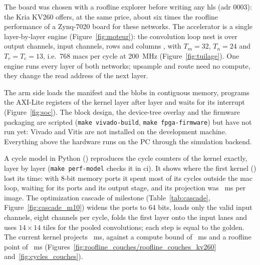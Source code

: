 \documentclass[11pt,a4paper]{article}
\begin{document}
The board was chosen with a \gls{roofline} explorer before writing any \gls{hls} (\gls{adr} 0003): the Kria
KV260 offers, at the same price, about six times the \gls{roofline} performance of a Zynq-7020
board for these networks. The accelerator is a single layer-by-layer engine
(Figure~\ref{fig:moteur}): the convolution loop nest is  over output channels, input
channels, rows and columns \cite[\#010.2]{2015-zhang}, with $T_m=32$, $T_n=24$ and
$T_r=T_c=13$, i.e.\ 768 \glspl{mac} per cycle at 200~MHz (Figure~\ref{fig:tuilage}). One engine
runs every layer of both networks; \gls{upsample} and route need no compute, they change the
read address of the next layer.


The \gls{arm} side loads the \gls{manifest} and the blobs in contiguous memory, programs the AXI-Lite
registers of the kernel layer after layer and waits for its interrupt
(Figure~\ref{fig:soc}). The block design, the device-tree overlay and the firmware
packaging are scripted (\texttt{make vivado-build}, \texttt{make fpga-firmware}) but have
not run yet: Vivado and Vitis are not installed on the development machine. Everything
above the hardware runs on the PC through the simulation backend.


A cycle model in Python () reproduces the cycle counters of
the  kernel exactly, layer by layer (\texttt{make perf-model} checks it in \gls{ci}).
It shows where the first kernel () lost its time: with 8-bit memory ports it spent most
of its cycles outside the \gls{mac} loop, waiting for its ports and its output stage, and its
projection was ~ms per image. The optimization cascade of
milestone  (Table~\ref{tab:cascade}, Figure~\ref{fig:cascade_m10}) widens the ports to
64 bits, loads only the valid input channels,  eight channels per cycle, folds
the first layer onto the input lanes and uses $14\times14$ \glspl{tile} for the pooled
convolutions; each step is  equal to the \gls{golden}. The current kernel projects
~ms, against a compute bound of ~ms
and a \gls{roofline} point of ~ms
(Figures~\ref{fig:roofline_couches/roofline_couches_kv260} and~\ref{fig:cycles_couches}).

\begin{table}[htbp]
\caption{Optimization cascade of the kernel, Tiny-YOLOv2, accelerator only
().}
\label{tab:cascade}
\small{}
\end{table}
\end{document}
